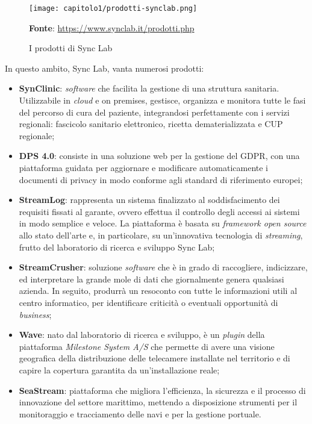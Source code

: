 \begin{figure}[!h]
  \centering
  \texttt{[image: capitolo1/prodotti-synclab.png]}
  \caption{I prodotti di Sync Lab}
  \textbf{Fonte}: \href{https://www.synclab.it/prodotti.php}{https://www.synclab.it/prodotti.php}
\end{figure}

\noindent In questo ambito, Sync Lab, vanta numerosi prodotti:
\begin{itemize}
  \item \textbf{SynClinic}: \textit{software} che facilita la gestione di una struttura sanitaria. Utilizzabile in \textit{cloud} e \gls{on premises}, gestisce, organizza e monitora tutte le fasi del percorso di cura del paziente, integrandosi perfettamente con i servizi regionali: fascicolo sanitario elettronico, ricetta dematerializzata e CUP regionale;
  
  \item \textbf{DPS 4.0}: consiste in una soluzione web per la gestione del GDPR, con una piattaforma guidata per aggiornare e modificare automaticamente i documenti di privacy in modo conforme agli standard di riferimento europei;
  
  \item \textbf{StreamLog}: rappresenta un sistema finalizzato al soddisfacimento dei requisiti fissati al garante, ovvero effettua il controllo degli accessi ai sistemi in modo semplice e veloce. La piattaforma è basata su \textit{framework open source} allo stato dell'arte e, in particolare, su un'innovativa tecnologia di \textit{streaming}, frutto del laboratorio di ricerca e sviluppo Sync Lab;
  
  \item \textbf{StreamCrusher}: soluzione \textit{software} che è in grado di raccogliere, indicizzare, ed interpretare la grande mole di dati che giornalmente genera qualsiasi azienda. In seguito, produrrà un resoconto con tutte le informazioni utili al centro informatico, per identificare criticità o eventuali opportunità di \textit{business};
  
  \item \textbf{Wave}: nato dal laboratorio di ricerca e sviluppo, è un \textit{plugin} della piattaforma \textit{Milestone System A/S} che permette di avere una visione geografica della distribuzione delle telecamere installate nel territorio e di capire la copertura garantita da un'installazione reale;
  
  \item \textbf{SeaStream}: piattaforma che migliora l'efficienza, la sicurezza e il processo di innovazione del settore marittimo, mettendo a disposizione strumenti per il monitoraggio e tracciamento delle navi e per la gestione portuale.  
\end{itemize}

